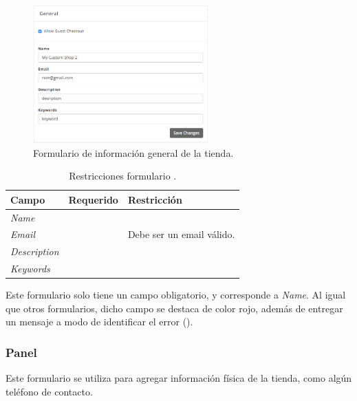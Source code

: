 \begin{figure}[H]
	\centering
	\includegraphics[width=0.6\textwidth]{figuras/dashboard/ecommerce/general_menu/menu.png}
	\caption{Formulario de información general de la tienda.}
	\label{figure:dashboard:ecommerce:general_menu:menu}
\end{figure}

\begin{table}[H]
    \centering
	\begin{tabular}{ |l|c||l| }
		\hline Campo & Requerido & Restricción \\ \hline
		\multirow{1}{*}{\textit{Name}} 			&  {\checkmark} &  \\ \hline
		\multirow{1}{*}{\textit{Email}} 		&  				&  Debe ser un email válido.\\ \hline
		\multirow{1}{*}{\textit{Description}} 	&  				&  \\ \hline
		\multirow{1}{*}{\textit{Keywords}} 		&  				&  \\ \hline
		\hline
	\end{tabular}
 	\caption{Restricciones formulario \generalPanel.}
    \label{tab:dashboard:ecommerce:form:general}
\end{table}


Este formulario solo tiene un campo obligatorio, y corresponde a \textit{Name}. Al igual que otros formularios, dicho campo se destaca de color rojo, además de entregar un mensaje a modo de identificar el error ().



\subsubsection*{Panel \addressPanel}\label{capitulo:solucionImplementada:dashboard:subsubsection:addressPanel}

Este formulario se utiliza para agregar información física de la tienda, como algún teléfono de contacto.

